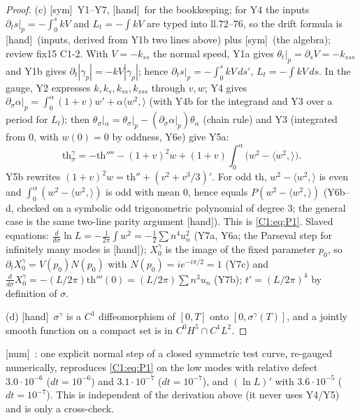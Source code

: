 \documentclass[11pt]{article}
\newcommand{\fn}[1]{\texttt{\detokenize{#1}}}
\newcommand{\tH}{\textup{[hand]}}\newcommand{\tS}{\textup{[sym]}}\newcommand{\tC}{\textup{[cert]}}\newcommand{\tI}{\textup{[cited]}}\newcommand{\tN}{\textup{[num]}}
\newcommand{\ip}[2]{\langle#1,#2\rangle}
\begin{document}
\begin{proof}
(c) \tS\ Y1--Y7, \tH\ for the bookkeeping; for Y4 the inputs $\partial_ts|_p=-\int_0^skV$ and $L_t=-\int kV$ are typed into \fn{C1_sym.py} ll.72--76, so the drift formula is \tH\ (inputs, derived from Y1b two lines above) plus \tS\ (the algebra); review fix15 C1-2. With $V=-k_{ss}$ the normal speed, Y1a gives $\theta_t|_p=\partial_sV=-k_{sss}$ and Y1b gives $\partial_t|\gamma_p|=-kV|\gamma_p|$; hence $\partial_ts|_p=-\int_0^skV\,ds'$, $L_t=-\int kV\,ds$. In the gauge, Y2 expresses $k,k_s,k_{ss},k_{sss}$ through $v,w$; Y4 gives $\partial_\sigma\alpha|_p=\int_0^\alpha(1+v)w'+\alpha\ip{w^2}{}$ (with Y4b for the integrand and Y3 over a period for $L_t$); then $\theta_\sigma|_\alpha=\theta_\sigma|_p-(\partial_\sigma\alpha|_p)\theta_\alpha$ (chain rule) and Y3 (integrated from $0$, with $w(0)=0$ by oddness, Y6e) give Y5a:
\[\mathrm{th}^\gamma_\sigma=-\mathrm{th}''''-(1+v)^2w+(1+v)\int_0^\alpha\bigl(w^2-\ip{w^2}{}\bigr).\]
Y5b rewrites $(1+v)^2w=\mathrm{th}''+(v^2+v^3/3)'$. For odd $\mathrm{th}$, $w^2-\ip{w^2}{}$ is even and $\int_0^\alpha(w^2-\ip{w^2}{})$ is odd with mean $0$, hence equals $P(w^2-\ip{w^2}{})$ (Y6b--d, checked on a symbolic odd trigonometric polynomial of degree 3; the general case is the same two-line parity argument \tH). This is \eqref{C1:eq:P1}. Slaved equations: $\frac{d}{d\sigma}\ln L=-\frac1{2\pi}\int w^2=-\frac12\sum n^4u_n^2$ (Y7a, Y6a; the Parseval step for infinitely many modes is \tH); $X_0^\gamma$ is the image of the fixed parameter $p_0$, so $\partial_tX^\gamma_0=V(p_0)N(p_0)$ with $N(p_0)=ie^{-i\pi/2}=1$ (Y7c) and $\frac{d}{d\sigma}X^\gamma_0=-(L/2\pi)\mathrm{th}'''(0)=(L/2\pi)\sum n^3u_n$ (Y7b); $t'=(L/2\pi)^4$ by definition of $\sigma$.

(d) \tH\ $\sigma^\gamma$ is a $C^1$ diffeomorphism of $[0,T]$ onto $[0,\sigma^\gamma(T)]$, and a jointly smooth function on a compact set is in $C^0H^5\cap C^1L^2$.
\end{proof}
\noindent\tN\ \fn{C1_num.py}: one explicit normal step of a closed symmetric test curve, re-gauged numerically, reproduces \eqref{C1:eq:P1} on the low modes with relative defect $3.0\cdot10^{-6}$ ($dt=10^{-6}$) and $3.1\cdot10^{-7}$ ($dt=10^{-7}$), and $(\ln L)'$ with $3.6\cdot10^{-5}$ ($dt=10^{-7}$). This is independent of the derivation above (it never uses Y4/Y5) and is only a cross-check.
\end{document}
